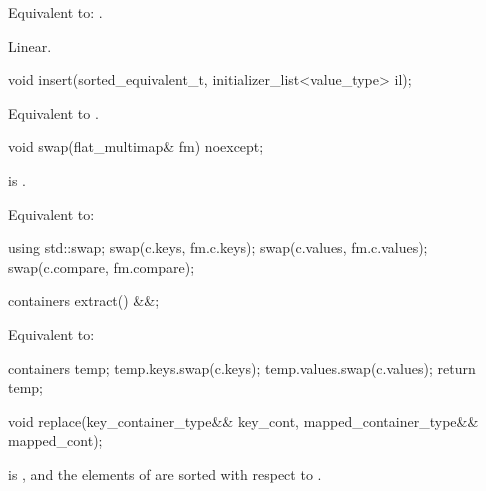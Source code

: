 \begin{codeblock}
\begin{codeblock}
\begin{codeblock}
\begin{addedblock}
\begin{itemdescr}
\pnum \effects Equivalent to: .

\pnum \complexity Linear.
\end{itemdescr}

%
\begin{itemdecl}
void insert(sorted_equivalent_t, initializer_list<value_type> il);
\end{itemdecl}

\begin{itemdescr}
\pnum \effects Equivalent to .
\end{itemdescr}

%
\begin{itemdecl}
void swap(flat_multimap& fm) noexcept;
\end{itemdecl}

\begin{itemdescr}
\pnum \constraints {} is .

\pnum \effects Equivalent to:
\begin{codeblock}
using std::swap;
swap(c.keys, fm.c.keys);
swap(c.values, fm.c.values);
swap(c.compare, fm.compare);
\end{codeblock}
\end{itemdescr}

%
\begin{itemdecl}
containers extract() &&;
\end{itemdecl}

\begin{itemdescr}
\effects Equivalent to:
\begin{codeblock}
containers temp;
temp.keys.swap(c.keys);
temp.values.swap(c.values);
return temp;
\end{codeblock}
\end{itemdescr}

%
\begin{itemdecl}
void replace(key_container_type&& key_cont, mapped_container_type&& mapped_cont);
\end{itemdecl}

\begin{itemdescr}
\pnum \expects
{} is , and the elements of
 are sorted with respect to .


\end{itemdescr}
\end{addedblock}
\end{codeblock}
\end{codeblock}
\end{codeblock}
